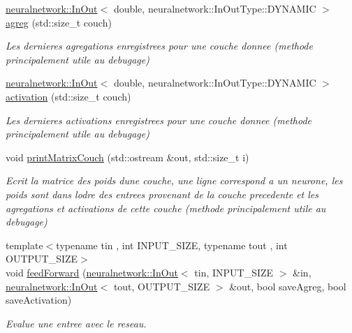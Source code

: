 \begin{DoxyCompactItemize}
\mbox{\hyperlink{_perceptron_8hpp_a1df3992453d71de615dab4ca5eadba8d}{neuralnetwork\+::\+In\+Out}}$<$ double, neuralnetwork\+::\+In\+Out\+Type\+::\+D\+Y\+N\+A\+M\+IC $>$ \mbox{\hyperlink{classneuralnetwork_1_1_perceptron_a41fec540bd2a224e43ab156623fce304}{agreg}} (std\+::size\+\_\+t couch)
\begin{DoxyCompactList}\small\item\em Les dernieres agregations enregistrees pour une couche donnee (methode principalement utile au debugage) \end{DoxyCompactList}\item 
\mbox{\hyperlink{_perceptron_8hpp_a1df3992453d71de615dab4ca5eadba8d}{neuralnetwork\+::\+In\+Out}}$<$ double, neuralnetwork\+::\+In\+Out\+Type\+::\+D\+Y\+N\+A\+M\+IC $>$ \mbox{\hyperlink{classneuralnetwork_1_1_perceptron_aaccd517b8c133cd12b19ec22f04a299e}{activation}} (std\+::size\+\_\+t couch)
\begin{DoxyCompactList}\small\item\em Les dernieres activations enregistrees pour une couche donnee (methode principalement utile au debugage) \end{DoxyCompactList}\item 
void \mbox{\hyperlink{classneuralnetwork_1_1_perceptron_ab05c12459b4ee03a75cc241b59aa0481}{print\+Matrix\+Couch}} (std\+::ostream \&out, std\+::size\+\_\+t i)
\begin{DoxyCompactList}\small\item\em Ecrit la matrice des poids d\textquotesingle{}une couche, une ligne correspond a un neurone, les poids sont dans l\textquotesingle{}odre des entrees provenant de la couche precedente et les agregations et activations de cette couche (methode principalement utile au debugage) \end{DoxyCompactList}\item 
{\footnotesize template$<$typename tin , int I\+N\+P\+U\+T\+\_\+\+S\+I\+ZE, typename tout , int O\+U\+T\+P\+U\+T\+\_\+\+S\+I\+ZE$>$ }\\void \mbox{\hyperlink{classneuralnetwork_1_1_perceptron_a83e9fbb5f68a8281fe29c51cc538e44c}{feed\+Forward}} (\mbox{\hyperlink{_perceptron_8hpp_a1df3992453d71de615dab4ca5eadba8d}{neuralnetwork\+::\+In\+Out}}$<$ tin, I\+N\+P\+U\+T\+\_\+\+S\+I\+ZE $>$ \&in, \mbox{\hyperlink{_perceptron_8hpp_a1df3992453d71de615dab4ca5eadba8d}{neuralnetwork\+::\+In\+Out}}$<$ tout, O\+U\+T\+P\+U\+T\+\_\+\+S\+I\+ZE $>$ \&out, bool save\+Agreg, bool save\+Activation)
\begin{DoxyCompactList}\small\item\em Evalue une entree avec le reseau. \end{DoxyCompactList}\item 

\end{DoxyCompactItemize}
